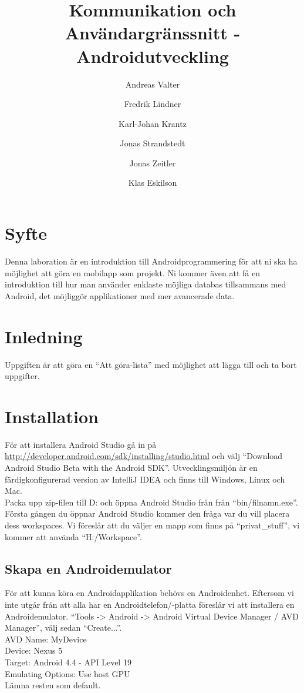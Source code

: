 \documentclass[11 pt, titlepage]{article} %
\begin{document}
\title{Kommunikation och Användargränssnitt - Androidutveckling}
\author{Andreas Valter \and Fredrik Lindner \and Karl-Johan Krantz \and Jonas Strandstedt \and Jonas Zeitler \and Klas Eskilson}
\maketitle

\section{Syfte}
Denna laboration är en introduktion till Androidprogrammering för att ni ska ha möjlighet att göra en mobilapp som projekt.
Ni kommer även att få en introduktion till hur man använder enklaste möjliga databas tillsammans med Android, det möjliggör applikationer med mer avancerade data.
\section{Inledning}
Uppgiften är att göra en “Att göra-lista” med möjlighet att lägga till och ta bort uppgifter.
\section{Installation}
För att installera Android Studio gå in på \href{http://developer.android.com/sdk/installing/studio.html}{http://developer.android.com/sdk/installing/studio.html} och välj “Download Android Studio Beta with the Android SDK”. Utvecklingsmiljön är en färdigkonfigurerad version av IntelliJ IDEA och finns till Windows, Linux och Mac.\\

Packa upp zip-filen till D: och öppna Android Studio från från “bin/filnamn.exe”.
Första gången du öppnar Android Studio kommer den fråga var du vill placera dess workspaces.
Vi föreslår att du väljer en mapp som finns på “privat\_stuff”, vi kommer att använda “H:/Workspace”.

%
%
%
%
%
%
%
%
%
%
%
%
%
%

\subsection{Skapa en Androidemulator}
För att kunna köra en Androidapplikation behövs en Androidenhet.
Eftersom vi inte utgår från att alla har en Androidtelefon/-platta föreslår vi att installera en Androidemulator.
“Tools -> Android -> Android Virtual Device Manager / AVD Manager”, välj sedan “Create...”.
\\
AVD Name: MyDevice\\
Device:  Nexus 5\\
Target:  Android 4.4 - API Level 19\\
Emulating Options:  Use host GPU\\
Lämna resten som default.\\
\end{document}
